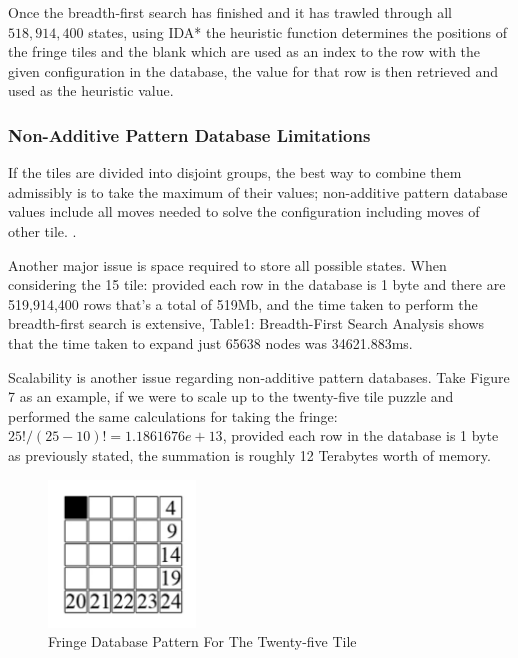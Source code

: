 \documentclass[progress]{cmpreport}
\begin{document}
Once the breadth-first search has finished and it has trawled through all $518,914,400$ states, using IDA* the heuristic function determines the positions of the fringe tiles and the blank which are used as an index to the row with the given configuration in the database, the value for that row is then retrieved and used as the heuristic value.

\subsubsection{Non-Additive Pattern Database Limitations}
If the tiles are divided into disjoint groups, the best way to combine them admissibly is to take the maximum of their values; non-additive pattern database values include all moves needed to solve the configuration including moves of other tile. \citep{DBLP:journals/corr/abs-1107-0050}.

Another major issue is space required to store all possible states. When considering the 15 tile: provided each row in the database is 1 byte and there are 519,914,400 rows that's a total of 519Mb, and the time taken to perform the breadth-first search is extensive, Table1: Breadth-First Search Analysis shows that the time taken to expand just 65638 nodes was 34621.883ms.

Scalability is another issue regarding non-additive pattern databases. Take Figure 7 as an example, if we were to scale up to the twenty-five tile puzzle and performed the same calculations for taking the fringe: $25!/(25-10)!=1.1861676e+13$, provided each row in the database is 1 byte as previously stated, the summation is roughly 12 Terabytes worth of memory.



\begin{figure}[ht]
	\centering
	\includegraphics[width=0.35\textwidth]{fringe15}
	\captionsetup{justification=centering}
	\caption{Fringe Database Pattern For The Twenty-five Tile}
\end{figure}
\end{document}
